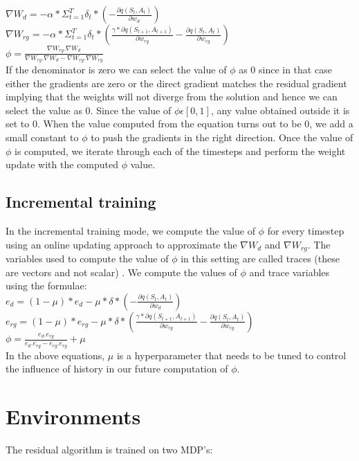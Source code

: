 \documentclass[fleqn]{article}
\begin{document}
$\nabla W_d = -\alpha * \Sigma_{t=1}^{T} \delta_{t} * (-\frac{\partial q(S_t, A_t)}{\partial w_d})$\\
$\nabla W_{rg} = -\alpha * \Sigma_{t=1}^{T} \delta_{t} * (\frac{ \gamma * \partial q(S_{t+1}, A_{t+1})}{\partial w_{rg}}-\frac{\partial q(S_t, A_t)}{\partial w_{rg}})$\\
$\phi = \frac{\nabla W_{rg} . \nabla W_{d}}{\nabla W_{rg} . \nabla W_{d} - \nabla W_{rg} . \nabla W_{rg}}$\\ 

If the denominator is zero we can select the value of $\phi$ as 0 since in that case either the gradients are zero or the direct gradient matches the residual gradient implying that the weights will not diverge from the solution and hence we can select the value as 0. Since the value of $\phi \epsilon [0,1]$, any value obtained outside it is set to 0. When the value computed from the equation turns out to be 0, we add a small constant to $\phi$ to push the gradients in the right direction. Once the value of $\phi$ is computed, we iterate through each of the timesteps and perform the weight update with the computed $\phi$ value. 

\subsection*{Incremental training}
In the incremental training mode, we compute the value of $\phi$ for every timestep using an online updating approach to approximate the $\nabla W_d$ and $\nabla W_{rg}$. The variables used to compute the value of $\phi$ in this setting are called traces (these are vectors and not scalar) . We compute the values of $\phi$ and trace variables using the formulae:\\
$e_d = (1-\mu)*e_d - \mu * \delta * (-\frac{\partial q(S_t, A_t)}{\partial w_d}) $\\
$e_{rg} = (1-\mu)*e_{rg} - \mu * \delta * (\frac{ \gamma * \partial q(S_{t+1}, A_{t+1})}{\partial w_{rg}}-\frac{\partial q(S_t, A_t)}{\partial w_{rg}}) $\\
$\phi = \frac{e_d . e_{rg}}{e_d.e_{rg} - e_{rg} . e_{rg}} + \mu$\\

In the above equations, $\mu$ is a hyperparameter that needs to be tuned to control the influence of history in our future computation of $\phi$.   

\section*{Environments}
The residual algorithm is trained on two MDP's:\\
\end{document}
